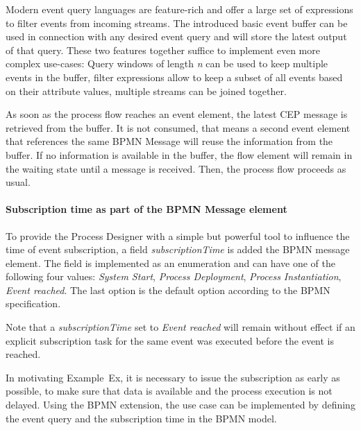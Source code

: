 Modern event query languages are feature-rich and offer a large set of expressions to filter events from incoming streams. 
The introduced basic event buffer can be used in connection with any desired event query and will store the latest output of that query.
These two features together suffice to implement even more complex use-cases: Query windows of length \textit{n} can be used to keep multiple events in the buffer, filter expressions allow to keep a subset of all events based on their attribute values, multiple streams can be joined together.

As soon as the process flow reaches an event element, the latest CEP message is retrieved from the buffer. It is not consumed, that means a second event element that references the same BPMN Message will reuse the information from the buffer.
If no information is available in the buffer, the flow element will remain in the waiting state until a message is received. Then, the process flow proceeds as usual.


\paragraph{Subscription time as part of the BPMN Message element\newline}
To provide the Process Designer with a simple but powerful tool to influence the time of event subscription, a field \textit{subscriptionTime} is added the BPMN message element. 
The field is implemented as an enumeration and can have one of the following four values: \textit{System Start}, \textit{Process Deployment}, \textit{Process Instantiation}, \textit{Event reached}. The last option is the default option according to the BPMN specification.

Note that a \textit{subscriptionTime} set to \textit{Event reached} will remain without effect if an explicit subscription task for the same event was executed before the event is reached.


In motivating Example~Ex, it is necessary to issue the subscription as early as possible, to make sure that data is available and the process execution is not delayed. 
Using the BPMN extension, the use case can be implemented by defining the event query and the subscription time in the BPMN model. 

